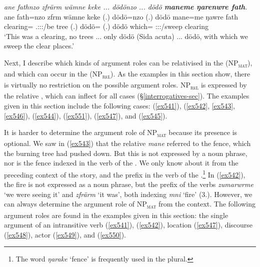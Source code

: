 \begin{exe}
	\ex \emph{ane fathnzo zfrärm wämne keke ... dödönzo ... dödö \textbf{maneme ŋarenwre fath}.}\\
	\gll ane fath=nzo zfrm wämne keke (.) dödö=nzo (.) dödö mane=me ŋawre fath\\
	{\Dem} clearing={\Only} \Tsg.\F:\Sbj:\Pst:\Dur/be tree {\Neg} (.) dödö={\Only} (.) dödö which={\Ins} \Fpl:\Sbj:\Nonpast:\Ipfv/sweep clearing\\
	\trans `This was a clearing, no trees ... only dödö (Sida acuta) ... dödö, with which we sweep the clear places.' 
	\label{ex545}
\end{exe}

Next, I describe which kinds of argument roles can be relativised in the  (NP\textsubscript{\textsc{mat}}), and which can occur in the  (NP\textsubscript{\textsc{rel}}). As the examples in this section show, there is virtually no restriction on the possible argument roles. NP\textsubscript{\textsc{rel}} is expressed by the relative , which can inflect for all cases ({\S}\ref{interrogatives-sec}). The examples given in this section include the following cases:  (\ref{ex541}),  (\ref{ex542}, \ref{ex543}, \ref{ex546}),  (\ref{ex544}),  (\ref{ex551}),  (\ref{ex547}), and  (\ref{ex545}).

It is harder to determine the argument role of NP\textsubscript{\textsc{mat}} because its presence is optional. We saw in (\ref{ex543}) that the relative  \emph{mane} referred to the fence, which the burning tree had pushed down. But this is not expressed by a noun phrase, nor is the fence indexed in the verb of the . We only know about it from the preceding context of the story, and the  prefix in the verb of the .\footnote{The word \emph{ŋarake} `fence' is frequently used in the plural.} In (\ref{ex542}), the fire is not expressed as a noun phrase, but the prefix of the verbs \emph{zumarwrme} `we were seeing it' and \emph{zfrärm} `it was', both indexing \emph{mni} `fire' (3\Sg.\F). However, we can always determine the argument role of NP\textsubscript{\textsc{mat}} from the context. The following argument roles are found in the examples given in this section: the single argument of an intransitive verb (\ref{ex541}),  (\ref{ex542}), location (\ref{ex547}), discourse  (\ref{ex548}), actor (\ref{ex549}), and  (\ref{ex550}).


